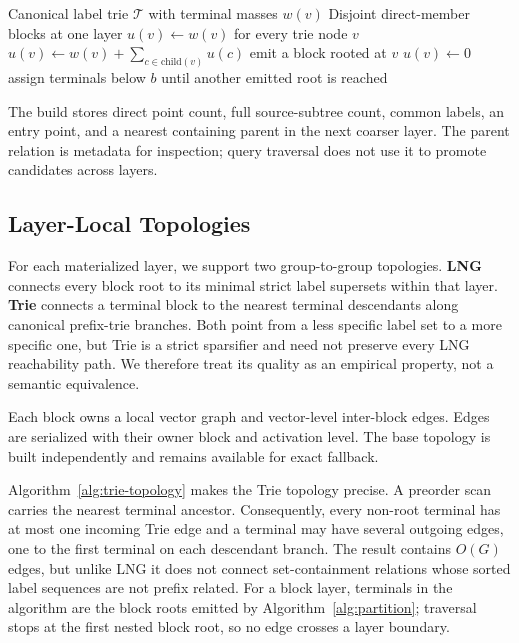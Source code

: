 \documentclass[sigconf,review,anonymous]{acmart}
\begin{document}
\begin{algorithm}[t]
\caption{Independent block partition at threshold $T$}
\label{alg:partition}
\begin{algorithmic}[1]
\Require Canonical label trie $\mathcal{T}$ with terminal masses $w(v)$
\Ensure Disjoint direct-member blocks at one layer
\State $u(v)\gets w(v)$ for every trie node $v$
  \State $u(v)\gets w(v)+\sum_{c\in\mathrm{child}(v)}u(c)$
    \State emit a block rooted at $v$
    \State $u(v)\gets 0$
  \EndIf
\EndFor
{}
  \State assign terminals below $b$ until another emitted root is reached
\EndFor
\end{algorithmic}
\end{algorithm}

The build stores direct point count, full source-subtree count, common labels,
an entry point, and a nearest containing parent in the next coarser layer.  The
parent relation is metadata for inspection; query traversal does not use it to
promote candidates across layers.

\subsection{Layer-Local Topologies}
For each materialized layer, we support two group-to-group topologies.
\textbf{LNG} connects every block root to its minimal strict label supersets
within that layer.  \textbf{Trie} connects a terminal block to the nearest
terminal descendants along canonical prefix-trie branches.  Both point from a
less specific label set to a more specific one, but Trie is a strict sparsifier
and need not preserve every LNG reachability path.  We therefore treat its
quality as an empirical property, not a semantic equivalence.

Each block owns a local vector graph and vector-level inter-block edges.  Edges
are serialized with their owner block and activation level.  The base topology
is built independently and remains available for exact fallback.

Algorithm~\ref{alg:trie-topology} makes the Trie topology precise.  A preorder
scan carries the nearest terminal ancestor.  Consequently, every non-root
terminal has at most one incoming Trie edge and a terminal may have several
outgoing edges, one to the first terminal on each descendant branch.  The
result contains $O(G)$ edges, but unlike LNG it does not connect set-containment
relations whose sorted label sequences are not prefix related.  For a block
layer, terminals in the algorithm are the block roots emitted by
Algorithm~\ref{alg:partition}; traversal stops at the first nested block root,
so no edge crosses a layer boundary.
\end{document}
